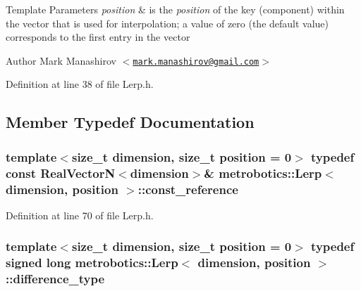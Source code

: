 \begin{DoxyTemplParams}{\-Template Parameters}
{\em position} & is the {\itshape position\/} of the key (component) within the vector that is used for interpolation; a value of zero (the default value) corresponds to the first entry in the vector\\
\hline
\end{DoxyTemplParams}
\begin{DoxyAuthor}{\-Author}
\-Mark \-Manashirov $<$\href{mailto:mark.manashirov@gmail.com}{\tt mark.\-manashirov@gmail.\-com}$>$ 
\end{DoxyAuthor}


\-Definition at line 38 of file \-Lerp.\-h.



\subsection{\-Member \-Typedef \-Documentation}
\hypertarget{classmetrobotics_1_1Lerp_a815b15d3fb2de9989d053e9d17fac48f}{
\subsubsection[{const\-\_\-reference}]{\setlength{\rightskip}{0pt plus 5cm}template$<$size\-\_\-t dimension, size\-\_\-t position = 0$>$ typedef const {\bf \-Real\-Vector\-N}$<$dimension$>$\& {\bf metrobotics\-::\-Lerp}$<$ dimension, position $>$\-::{\bf const\-\_\-reference}}}\label{classmetrobotics_1_1Lerp_a815b15d3fb2de9989d053e9d17fac48f}


\-Definition at line 70 of file \-Lerp.\-h.

\hypertarget{classmetrobotics_1_1Lerp_ab33debb53d79b253af93112e65630909}{
\subsubsection[{difference\-\_\-type}]{\setlength{\rightskip}{0pt plus 5cm}template$<$size\-\_\-t dimension, size\-\_\-t position = 0$>$ typedef signed long {\bf metrobotics\-::\-Lerp}$<$ dimension, position $>$\-::{\bf difference\-\_\-type}}}\label{classmetrobotics_1_1Lerp_ab33debb53d79b253af93112e65630909}


